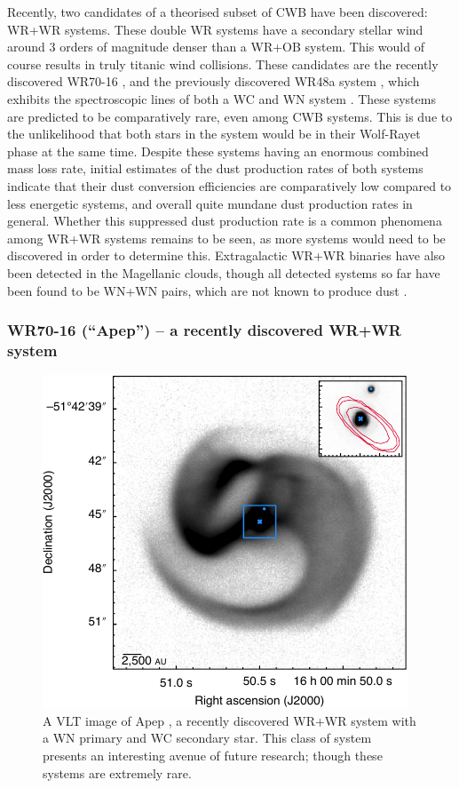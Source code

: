 Recently, two candidates of a theorised subset of CWB have been discovered: WR+WR systems.
These double WR systems have a secondary stellar wind around 3 orders of magnitude denser than a WR+OB system.
This would of course results in truly titanic wind collisions.
These candidates are the recently discovered WR70-16 \parencite{callinghamAnisotropicWindsWolf2019}, and the previously discovered WR48a system \parencite{danksInfraredSpectroscopyInfrared1983}, which exhibits the spectroscopic lines of both a WC and WN system \parencite{williamsVariableDustEmission2019}.
These systems are predicted to be comparatively rare, even among CWB systems.
This is due to the unlikelihood that both stars in the system would be in their Wolf-Rayet phase at the same time.
Despite these systems having an enormous combined mass loss rate, initial estimates of the dust production rates of both systems indicate that their dust conversion efficiencies are comparatively low compared to less energetic systems, and overall quite mundane dust production rates in general.
Whether this suppressed dust production rate is a common phenomena among WR+WR systems remains to be seen, as more systems would need to be discovered in order to determine this.
Extragalactic WR+WR binaries have also been detected in the Magellanic clouds, though all detected systems so far have been found to be WN+WN pairs, which are not known to produce dust \parencite{shenarWolfRayetBinaries2019}.

\subsubsection{WR70-16 (``Apep'') -- a recently discovered WR+WR system}
\label{sec:bg-apep}

\begin{figure}[h]
  \centering
  \includegraphics[]{assets/systems/apep-callingham-2019.pdf}
  \caption[\textit{VLT image of Apep \parencite{callinghamAnisotropicWindsWolf2019}}]{A VLT image of Apep \parencite{callinghamAnisotropicWindsWolf2019}, a recently discovered WR+WR system with a WN primary and WC secondary star. This class of system presents an interesting avenue of future research; though these systems are extremely rare.}
  \label{fig:apep-callingham}
\end{figure}

